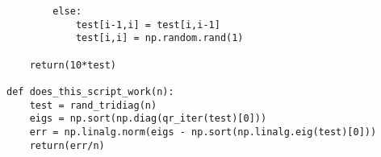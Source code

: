 \documentclass[10pt,a4paper]{article}
\begin{document}
\begin{verbatim}
        else:                                                                                                                                                                              
            test[i-1,i] = test[i,i-1]                                                                                                                                                      
            test[i,i] = np.random.rand(1)                                                                                                                                                  
                                                                                                                                                                                           
    return(10*test)                                                                                                                                                                    
                                                                                                                                                                                           
def does_this_script_work(n):                                                                                                                                                              
    test = rand_tridiag(n)                                                                                                                                                                 
    eigs = np.sort(np.diag(qr_iter(test)[0]))                                                                                                                                              
    err = np.linalg.norm(eigs - np.sort(np.linalg.eig(test)[0]))                                                                                                                           
    return(err/n)                                                                                                                                                                            
                              

\end{verbatim}
\end{document}
